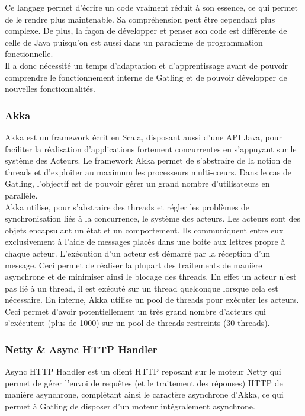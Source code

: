 Ce langage permet d'écrire un code vraiment réduit à son essence, ce qui permet de le rendre plus maintenable. Sa compréhension peut être cependant plus complexe. De plus, la façon de développer et penser son code est différente de celle de Java puisqu'on est aussi dans un paradigme de programmation fonctionnelle.\\

Il a donc nécessité un temps d'adaptation et d'apprentissage \cite{proginscala} avant de pouvoir comprendre le fonctionnement interne de Gatling et de pouvoir développer de nouvelles fonctionnalités.

\subsubsection{Akka}

Akka \cite{akka} est un framework écrit en Scala, disposant aussi d'une API Java, pour faciliter la réalisation d'applications fortement concurrentes en s'appuyant sur le système des Acteurs. Le framework Akka permet de s'abstraire de la notion de threads et d'exploiter au maximum les processeurs multi-cœurs. Dans le cas de Gatling, l'objectif est de pouvoir gérer un grand nombre d'utilisateurs en parallèle.\\

Akka utilise, pour s'abstraire des threads et régler les problèmes de synchronisation liés à la concurrence, le système des acteurs. Les acteurs sont des objets encapsulant un état et un comportement. Ils communiquent entre eux exclusivement à l'aide de messages placés dans une boite aux lettres propre à chaque acteur. L'exécution d'un acteur est démarré par la réception d'un message. Ceci permet de réaliser la plupart des traitements de manière asynchrone et de minimiser ainsi le blocage des threads. En effet un acteur n'est pas lié à un thread, il est exécuté sur un thread quelconque lorsque cela est nécessaire. En interne, Akka utilise un pool de threads pour exécuter les acteurs. Ceci permet d'avoir potentiellement un très grand nombre d'acteurs qui s'exécutent (plus de 1000) sur un pool de threads restreints (30 threads).

\subsubsection{Netty \& Async HTTP Handler}

Async HTTP Handler est un client HTTP reposant sur le moteur Netty qui permet de gérer l'envoi de requêtes (et le traitement des réponses) HTTP de manière asynchrone, complétant ainsi le caractère asynchrone d'Akka, ce qui permet à Gatling de disposer d'un moteur intégralement asynchrone. 

